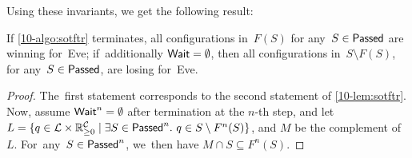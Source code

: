 Using these invariants, we get the following result:
\begin{lemma}
  If \cref{10-algo:sotftr} terminates, all configurations in~$F(S)$ for
  any~$S\in\textsf{Passed}$ are winning for~Eve;  if~additionally
  $\textsf{Wait}=\emptyset$, then all configurations in~$S\setminus F(S)$, for
  any~$S\in\textsf{Passed}$, are losing for~Eve.
\end{lemma}

\begin{proof}
The~first statement corresponds to the second statement of
\cref{10-lem:sotftr}. Now, assume $\textsf{Wait}^n=\emptyset$ after
termination at the $n$-th step,
and
let $L=\{q\in \mathcal{L}\times\mathbb{R}_{\geq 0}^{\mathcal{C}} \mid \exists
S\in\textsf{Passed}^n.\ q\in S\setminus F^n(S)\}$, and $M$ be the complement
of~$L$. For~any~$S\in\textsf{Passed}^n$, we~then have $M\cap S\subseteq
F^n(S)$.


\end{proof}
